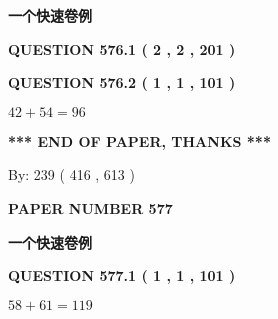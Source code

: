 \documentclass{ctexart}
\begin{document}
   
   
   
 \vspace{0.2in}
{\LARGE {\textbf{ 一个快速卷例}}}
   
   
  
\vspace{0.2in}
  
{\textbf{\Large{QUESTION
576.1 
 ( 2 , 2 , 201 )
}}}
  
  
  
\vspace{0.2in}
  
{\textbf{\Large{QUESTION
576.2 
 ( 1 , 1 , 101 )
}}}
  
  
 
 

$ %
42 +  %
54=   %
96$
 
 
   
   
 \vspace{0.2in}
 
   
   
   
   
\vspace{1.0in} 
{\textbf{\large{ *** END OF PAPER, THANKS *** }}} 
   
   
\hspace{1.0in} By: 
 239 ( 416 ,  613 )
   
   
   
   
\newpage 
\setcounter{page}{ 
   577001 } 
   
   
   
   
 {\textbf{ \Large{ PAPER NUMBER  577  }}}
   
   
\vspace{0.2in}
   
   
   
   
   
   
 \vspace{0.2in}
{\LARGE {\textbf{ 一个快速卷例}}}
   
   
  
\vspace{0.2in}
  
{\textbf{\Large{QUESTION
577.1 
 ( 1 , 1 , 101 )
}}}
  
  
 
 

$ %
58 +  %
61=   %
119$
 
 
  
\vspace{0.2in}
  
\end{document}
